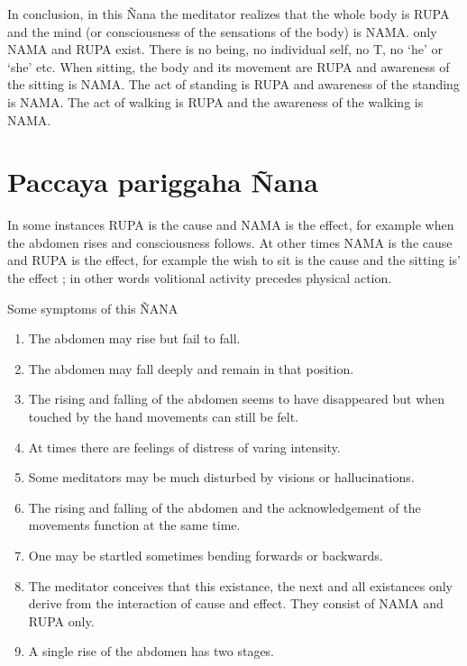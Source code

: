 \documentclass[a5paper,10pt,english]{book}
\begin{document}
\sphinxAtStartPar
In conclusion, in this Ñana the meditator realizes that the whole body is RUPA and the mind (or consciousness of the sensations of the body) is NAMA. only NAMA and RUPA exist. There is no being, no individual self, no T, no ‘he’ or ‘she’ etc. When sitting, the body and its movement are RUPA and awareness of the sitting is NAMA. The act of standing is RUPA and awareness of the standing is NAMA. The act of walking is RUPA and the awareness of the walking is NAMA.


\section{Paccaya pariggaha Ñana}
\label{\detokenize{progress:paccaya-pariggaha-nana}}
\sphinxAtStartPar
{}

\sphinxAtStartPar
In some instances RUPA is the cause and NAMA is the effect, for example when the abdomen rises and consciousness follows. At other times NAMA is the cause and RUPA is the effect, for example the wish to sit is the cause and the sitting is’ the effect ; in other words volitional activity precedes physical action.

\sphinxAtStartPar
Some symptoms of this ÑANA
\begin{enumerate}
%
\item {} 
\sphinxAtStartPar
The abdomen may rise but fail to fall.

\item {} 
\sphinxAtStartPar
The abdomen may fall deeply and remain in that position.

\item {} 
\sphinxAtStartPar
The rising and falling of the abdomen seems to have disappeared but when touched by the hand movements can still be felt.

\item {} 
\sphinxAtStartPar
At times there are feelings of distress of varing intensity.

\item {} 
\sphinxAtStartPar
Some meditators may be much disturbed by visions or hallucinations.

\item {} 
\sphinxAtStartPar
The rising and falling of the abdomen and the acknowledgement of the movements function at the same time.

\item {} 
\sphinxAtStartPar
One may be startled sometimes bending forwards or backwards.

\item {} 
\sphinxAtStartPar
The meditator conceives that this existance, the next and all existances only derive from the interaction of cause and effect. They consist of NAMA and RUPA only.

\item {} 
\sphinxAtStartPar
A single rise of the abdomen has two stages.

\end{enumerate}
\end{document}
